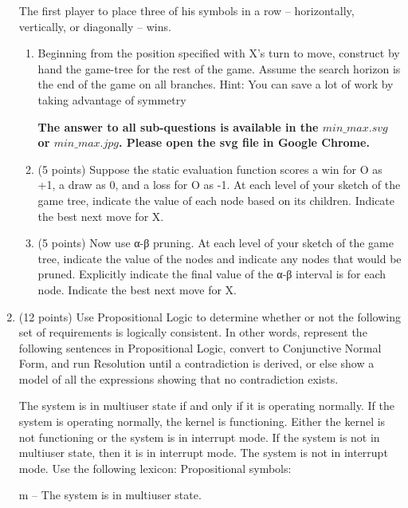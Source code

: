 \documentclass[letterpaper]{article}
\begin{document}
\begin{enumerate}
  	The first player to place three of his symbols in a row -- horizontally,
  	vertically, or diagonally -- wins.
	
	\begin{enumerate}

	  \item Beginning from the position specified with X's turn to move, construct by hand
	   the game-tree for the rest of the game. Assume the search horizon is the end of the
	   game on all branches. Hint: You can save a lot of work by taking advantage
	   of symmetry
	   \begin{answer}
	   		\textbf{The answer to all sub-questions is available in the $min\_max.svg$
	   		or $min\_max.jpg$. Please open the svg file in Google Chrome.}
	   \end{answer}
	   
	  \item (5 points) Suppose the static evaluation function scores a win for O as
	  +1, a draw as 0, and a loss for O as -1. At each level of your sketch of the game tree, 
	  indicate the value of each node based on its children. Indicate the best next move for X.

	  \item (5 points) Now use α-β pruning. At each level of your sketch of the
	  game tree, indicate the value of the nodes and indicate any nodes that would be pruned.
	  Explicitly indicate the final value of the α-β interval is for each node. Indicate the best next move for X.
	\end{enumerate}
	
	\newpage
	\item (12 points) Use Propositional Logic to determine whether or not the
	following set of requirements is logically consistent. In other words, represent the following sentences 
	in Propositional Logic, convert to Conjunctive Normal Form, and run Resolution until a contradiction is derived,
	or else show a model of all the expressions showing that no contradiction exists.
	
	The system is in multiuser state if and only if it is operating normally. 
	If the system is operating normally, the kernel is functioning. 
	Either the kernel is not functioning or the system is in interrupt mode. 
	If the system is not in multiuser state, then it is in interrupt mode. 
	The system is not in interrupt mode.
	Use the following lexicon:
	Propositional symbols:
	
	m -- The system is in multiuser state.
	

\end{enumerate}
\end{document}
